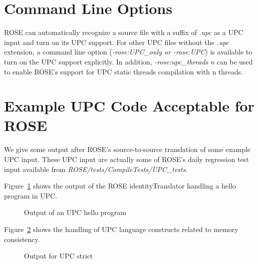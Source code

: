 \section{Command Line Options}
ROSE can automatically recognize a source file with a suffix of \textit{.upc} as a UPC input and turn on its UPC support.
For other UPC files without the \textit{.upc} extension, a command line
option (\textit{-rose:UPC\_only or -rose:UPC}) is available to turn on the
UPC support explicitly.
In addition, \textit{-rose:upc\_threads n} can be used to enable ROSE's
support for UPC static threads compilation with n threads.

\section{Example UPC Code Acceptable for ROSE}
We give some output after ROSE's source-to-source translation of some example UPC input. 
These UPC input are actually some of ROSE's daily regression test input available from \textit{ROSE/tests/CompileTests/UPC\_tests}.

Figure~\ref{Manual:UPC:hello} shows the output of the ROSE
identityTranslator handling a hello program in UPC.
\begin{figure}[!h]
{\indent
  {\mySmallFontSize
    \begin{latexonly}
    
    \end{latexonly}
    \begin{htmlonly}
    
    \end{htmlonly}
  }
}
\caption{Output of an UPC hello program}
\label{Manual:UPC:hello}
\end{figure}

Figure~\ref{Manual:UPC:strict} shows the handling of UPC language
constructs related to memory consistency. 
\begin{figure}[!h]
{\indent
  {\mySmallFontSize
    \begin{latexonly}
    
    \end{latexonly}
    \begin{htmlonly}
    
    \end{htmlonly}
  }
}
\caption{Output for UPC strict}
\label{Manual:UPC:strict}
\end{figure}


